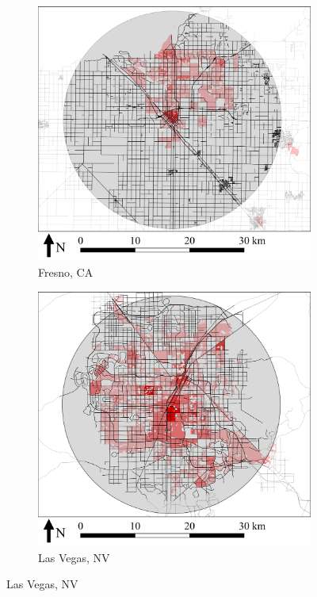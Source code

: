 \documentclass{elsarticle}\usepackage[]{graphicx}\usepackage[]{color}
\begin{document}
\begin{figure}[H]
     \begin{subfigure}[b]{0.49\textwidth}
         \centering
		 \includegraphics[width=\textwidth]{frs_vicmap}
        \caption{Fresno, CA}
         \label{fig:frsmap}
     \end{subfigure}
          \hfill            
     \begin{subfigure}[b]{0.49\textwidth}
         \centering
		 \includegraphics[width=\textwidth]{veg_vicmap}
        \caption{Las Vegas, NV}
         \label{fig:vegmap}
     \end{subfigure}
   

\end{figure}
\end{document}
